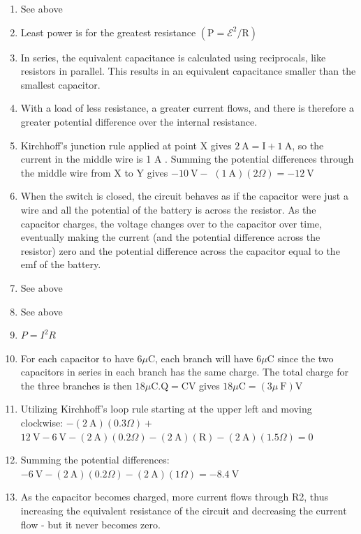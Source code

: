 \begin{enumerate}
\begin{enumerate}
  \item See above
  \item Least power is for the greatest resistance $\left(\mathrm{P}=\boldsymbol{\mathcal { E }}^{2} / \mathrm{R}\right)$
  \item In series, the equivalent capacitance is calculated using reciprocals, like resistors in parallel. This results in an equivalent capacitance smaller than the smallest capacitor.
  \item With a load of less resistance, a greater current flows, and there is therefore a greater potential difference over the internal resistance.
  \item Kirchhoff's junction rule applied at point X gives $2 \mathrm{~A}=\mathrm{I}+1 \mathrm{~A}$, so the current in the middle wire is 1 A . Summing the potential differences through the middle wire from X to Y gives $-10 \mathrm{~V}-$ $(1 \mathrm{~A})(2 \Omega)=-12 \mathrm{~V}$
  \item When the switch is closed, the circuit behaves as if the capacitor were just a wire and all the potential of the battery is across the resistor. As the capacitor charges, the voltage changes over to the capacitor over time, eventually making the current (and the potential difference across the resistor) zero and the potential difference across the capacitor equal to the emf of the battery.
  \item See above
  \item See above
  \item $P=I^{2} R$
  \item For each capacitor to have $6 \mu \mathrm{C}$, each branch will have $6 \mu \mathrm{C}$ since the two capacitors in series in each branch has the same charge. The total charge for the three branches is then $18 \mu \mathrm{C} . \mathrm{Q}=\mathrm{CV}$ gives $18 \mu \mathrm{C}=(3 \mu \mathrm{~F}) \mathrm{V}$
  \item Utilizing Kirchhoff's loop rule starting at the upper left and moving clockwise: $-(2 \mathrm{~A})(0.3 \Omega)+$ $12 \mathrm{~V}-6 \mathrm{~V}-(2 \mathrm{~A})(0.2 \Omega)-(2 \mathrm{~A})(\mathrm{R})-(2 \mathrm{~A})(1.5 \Omega)=0$
  \item Summing the potential differences: $-6 \mathrm{~V}-(2 \mathrm{~A})(0.2 \Omega)-(2 \mathrm{~A})(1 \Omega)=-8.4 \mathrm{~V}$
  \item As the capacitor becomes charged, more current flows through R2, thus increasing the equivalent resistance of the circuit and decreasing the current flow - but it never becomes zero.

\end{enumerate}
\end{enumerate}
